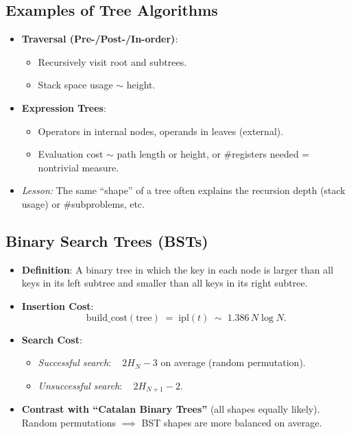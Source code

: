 \documentclass[11pt,letterpaper]{article}
\begin{document}
\subsection{Examples of Tree Algorithms}
\begin{itemize}
  \item \textbf{Traversal (Pre-/Post-/In-order)}: 
    \begin{itemize}
      \item Recursively visit root and subtrees. 
      \item Stack space usage $\sim$ height.
    \end{itemize}
  \item \textbf{Expression Trees}: 
    \begin{itemize}
      \item Operators in internal nodes, operands in leaves (external). 
      \item Evaluation cost $\sim$ path length or height, or \#registers needed = nontrivial measure.
    \end{itemize}
  \item \emph{Lesson:} The same “shape” of a tree often explains the recursion depth (stack usage) or \#subproblems, etc.
\end{itemize}

\subsection{Binary Search Trees (BSTs)}
\begin{itemize}
  \item \textbf{Definition}: A binary tree in which the key in each node is larger than all keys in its left subtree and smaller than all keys in its right subtree.
  \item \textbf{Insertion Cost}:
    \[
      \mathrm{build\_cost}(\text{tree}) \;=\;\mathrm{ipl}(t)\;\sim\;1.386\,N\log N.
    \]
  \item \textbf{Search Cost}:
    \begin{itemize}
      \item \emph{Successful search}: ~ $2H_N-3$ on average (random permutation). 
      \item \emph{Unsuccessful search}: ~ $2H_{N+1}-2$.
    \end{itemize}
  \item \textbf{Contrast with “Catalan Binary Trees”} (all shapes equally likely). Random permutations $\implies$ BST shapes are more balanced on average.
\end{itemize}
\end{document}
